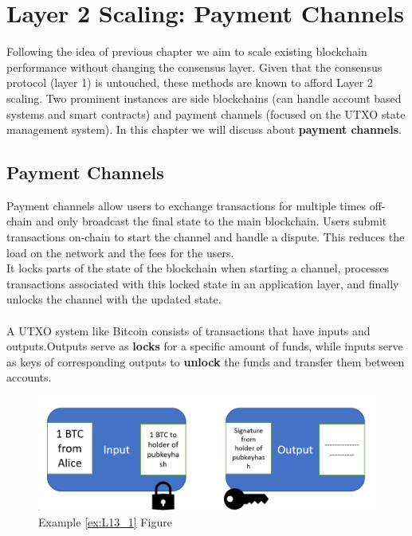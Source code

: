 \chapter{Layer 2 Scaling: Payment Channels}
Following the idea of previous chapter we aim to scale existing blockchain performance without changing the consensus layer. Given that the consensus protocol (layer 1) is untouched, these methods are known to afford Layer 2 scaling. Two prominent
instances are side blockchains (can handle account based systems and smart contracts) and payment channels (focused on the UTXO state management system). In this chapter we will discuss about \textbf{payment channels}.

\section{Payment Channels}
Payment channels allow users to exchange transactions for multiple times off-chain and only broadcast the final state to the main blockchain. Users submit transactions on-chain to start the channel and handle a dispute. This reduces the load on the network and the fees for the users. \\
It locks parts of the state of the blockchain when starting a channel, processes transactions associated with this locked state in an application layer, and finally unlocks the channel with the updated state.\\\\
A UTXO system like Bitcoin consists of transactions that have inputs and outputs.Outputs serve as \textbf{locks} for a specific amount of funds, while inputs serve as keys of corresponding outputs to \textbf{unlock} the funds and transfer them between accounts.

\begin{figure}[h!]
	\centering
	\includegraphics[width=0.7\linewidth]{Fig/13/F1}
	\caption{Example \ref{ex:L13_1} Figure}
	\label{fig:L13_f1}
\end{figure}

